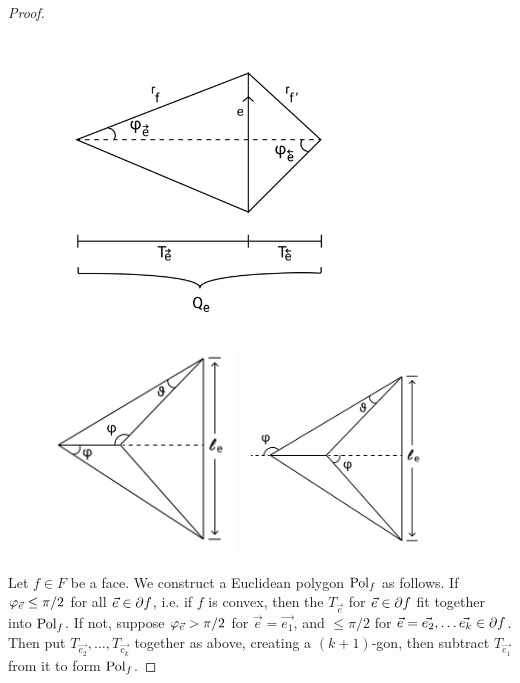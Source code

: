\begin{proof}
\begin{figure}
\includegraphics[width=8cm]{more_pictures/kite.png}
\end{figure}
\begin{figure}
\includegraphics[width=5cm]{more_pictures/positive_angle.png}
\includegraphics[width=5cm]{more_pictures/negative_angle.png}
\end{figure}


Let $f \in F$ be a face.
We construct a Euclidean polygon ${\text{Pol}}_f$ as follows.
If $\varphi_{\vec{e}} \leq \pi/2$ for all $\vec{e} \in \partial f$,
i.e. if $f$ is convex, then 
the $T_{\vec{e}}$ for $\vec{e}\in \partial f$
fit together into ${\text{Pol}}_f$.
If not, suppose $\varphi_{\vec{e}} > \pi/2$
for $\vec{e} = \vec{e_1}$, 
and $\leq \pi/2$ for $\vec{e} = \vec{e_2},\ldots \vec{e_k} \in \partial f$.
Then put $T_{\vec{e_2}},\ldots,T_{\vec{e_k}}$ together as above,
creating a $(k+1)$-gon,
then subtract $T_{\vec{e_1}}$ from it to form ${\text{Pol}}_f$.


\end{proof}
